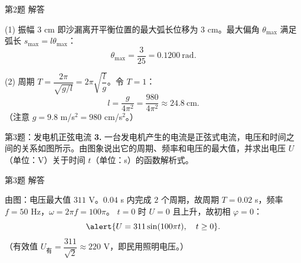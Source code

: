 \documentclass[10pt,aspectratio=169,serif]{beamer}
\begin{document}
\begin{frame}[t]{第2题 解答}
\begin{tcolorbox}[colback=orange!10,colframe=orange,title=\textbf{解}]
(1) 振幅 $3$ cm 即沙漏离开平衡位置的最大弧长位移为 $3$ cm。最大偏角 $\theta_{\max}$ 满足弧长 $s_{\max}=l\theta_{\max}$：
\[
\theta_{\max}=\frac{3}{25}=0.1200\ \text{rad}.
\]

(2) 周期 $T=\dfrac{2\pi}{\sqrt{g/l}}=2\pi\sqrt{\dfrac{l}{g}}$。令 $T=1$：
\[
l=\frac{g}{4\pi^2}=\frac{980}{4\pi^2}\approx 24.8\ \text{cm}.
\]
（注意 $g=9.8$ m/s$^2=980$ cm/s$^2$。）
\end{tcolorbox}
\end{frame}

\begin{frame}[t]{第3题：发电机正弦电流}
\textbf{3.} 一台发电机产生的电流是正弦式电流，电压和时间之间的关系如图所示。由图象说出它的周期、频率和电压的最大值，并求出电压 $U$（单位：V）关于时间 $t$（单位：s）的函数解析式。

\begin{center}
\end{center}
\end{frame}

\begin{frame}[t]{第3题 解答}
\begin{tcolorbox}[colback=orange!10,colframe=orange,title=\textbf{解}]
由图：电压最大值 $311$ V。$0.04$ s 内完成 $2$ 个周期，故周期 $T=0.02$ s，频率 $f=50$ Hz，$\omega=2\pi f=100\pi$。
$t=0$ 时 $U=0$ 且上升，故初相 $\varphi=0$：
\[
\alert{U=311\sin(100\pi t),\quad t\ge 0}.
\]
（有效值 $U_{\text{有}}=\dfrac{311}{\sqrt2}\approx 220$ V，即民用照明电压。）
\end{tcolorbox}
\end{frame}
\end{document}
